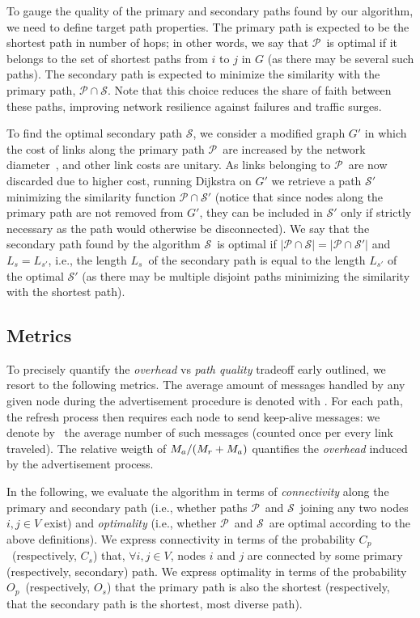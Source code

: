 \documentclass[conference]{IEEEtran}
\newcommand{\PA}{\ensuremath{\mathcal{P}}}
\newcommand{\SE}{\ensuremath{\mathcal{S}}}
\newcommand{\path}[1]{\ensuremath{\mathcal{#1}}} \newcommand{\lenP}{\ensuremath{L_p}} \newcommand{\lenS}{\ensuremath{L_s}} \newcommand{\degr}{\ensuremath{\bar{\delta}}} \newcommand{\diamp}{\ensuremath{D_p}} \newcommand{\diams}{\ensuremath{D_s}}
\newcommand{\np}{\nrefresh}
\newcommand{\pc}{\ensuremath{C_p}}   \newcommand{\seco}{\ensuremath{C_s}} \newcommand{\po}{\ensuremath{O_p}}   \newcommand{\so}{\ensuremath{O_s}}
\begin{document}
To gauge the quality of the primary and secondary paths found by our algorithm, 
we need to define target path properties. The primary path is expected to be  the shortest path in number of hops; in other words, we say that  \PA\ is optimal if it belongs to the set of shortest paths from $i$ to $j$  in $G$ (as there may be several such paths). The secondary path is expected to  minimize the similarity with the primary path, $\PA \cap \SE$. Note that this choice reduces the share of faith between these paths, improving network resilience against failures and traffic surges.

To find the optimal secondary path \SE, we consider a modified graph $G'$ in which the cost of links along the primary path \PA\ are increased by the network diameter~\cite{Ogier93IEETrans}, and other link costs are unitary. As links belonging to \PA\ are now discarded due to higher cost, running Dijkstra on $G'$ we retrieve a path \path{S'} minimizing the similarity function $\PA\cap \path{S'}$ (notice that since nodes along the primary path are not removed from $G'$, they can be included in \path{S'} only if strictly necessary as the path would otherwise be disconnected). We say that the secondary path found by the algorithm \SE\ is  optimal if $|\path{P}\cap \path{S}|=|\path{P}\cap \path{S'}|$ and $\lenS=L_{s'}$, i.e., the length \lenS\ of the secondary path is equal to the length $L_{s'}$ of the optimal  $\path{S'}$ (as there may be multiple disjoint paths minimizing the similarity with the shortest path).


\subsection{Metrics}

To precisely quantify the  \emph{overhead} vs \emph{path quality} tradeoff early outlined, we resort to the following metrics.
The average amount of messages handled by any given node during the advertisement procedure is denoted with \nm. For each path, the refresh process then requires each node to send keep-alive messages: we denote by  \np\ the average number of such messages (counted once per every link traveled). The relative weigth of $\nm /(\np +\nm)$ quantifies the \emph{overhead} induced by the advertisement process.

In the following, we evaluate the algorithm in terms of \emph{connectivity} along the primary and secondary path (i.e., whether paths  \PA\ and \SE\ joining any two nodes $i,j\in V$ exist) and \emph{optimality} (i.e., whether  \PA\ and \SE\ are optimal according to the above definitions).
We  express connectivity in terms of the probability \pc\ (respectively, \seco) that, $\forall i,j\in V$, nodes $i$ and $j$ are connected by some primary (respectively, secondary) path.   
We express  optimality in terms of the probability \po\ (respectively, \so) that the primary path is also the shortest (respectively, that the secondary path is the shortest, most diverse path).
\end{document}
